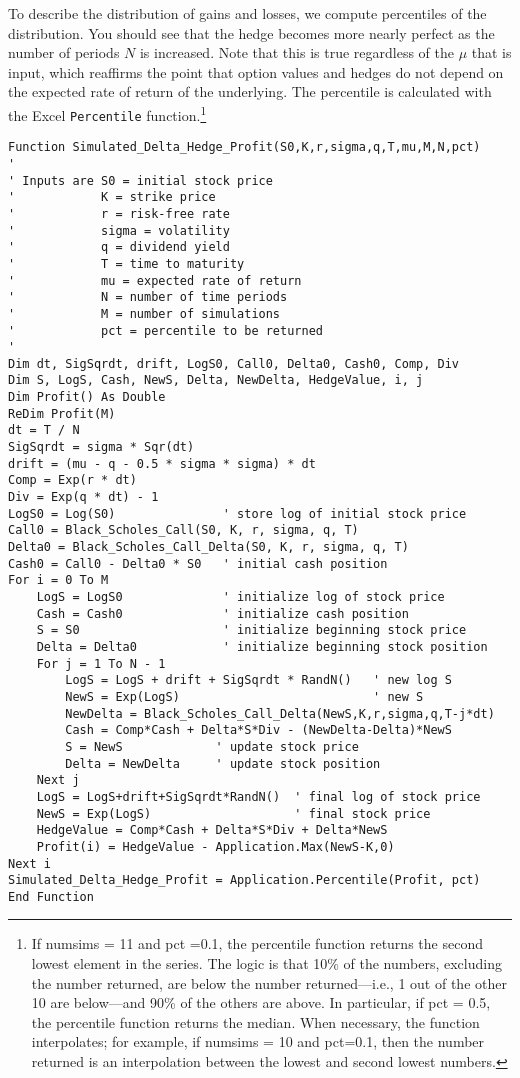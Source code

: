 To describe the distribution of gains and losses, we compute percentiles of the distribution.  You should see that the hedge becomes more nearly perfect as the number of periods $N$ is increased.  Note that this is true regardless of the $\mu$ that is input, which reaffirms the point that option values and hedges do not depend on the expected rate of return of the underlying. The percentile is calculated with the Excel \verb!Percentile! function.\footnote{If numsims = 11 and pct =0.1, the percentile function returns the second lowest element in the series.  The logic is that 10\% of the numbers, excluding the number returned, are below the number returned---i.e., 1 out of the other 10 are below---and 90\% of the others are above.  In particular, if pct = 0.5, the percentile function returns the median.  When necessary, the function interpolates; for example, if numsims = 10 and pct=0.1, then the number returned is an interpolation between the lowest and second lowest numbers.} 

\small\begin{verbatim}
Function Simulated_Delta_Hedge_Profit(S0,K,r,sigma,q,T,mu,M,N,pct)
'
' Inputs are S0 = initial stock price
'            K = strike price
'            r = risk-free rate
'            sigma = volatility
'            q = dividend yield
'            T = time to maturity
'            mu = expected rate of return
'            N = number of time periods
'            M = number of simulations
'            pct = percentile to be returned
'
Dim dt, SigSqrdt, drift, LogS0, Call0, Delta0, Cash0, Comp, Div
Dim S, LogS, Cash, NewS, Delta, NewDelta, HedgeValue, i, j
Dim Profit() As Double
ReDim Profit(M)
dt = T / N
SigSqrdt = sigma * Sqr(dt)
drift = (mu - q - 0.5 * sigma * sigma) * dt
Comp = Exp(r * dt)
Div = Exp(q * dt) - 1
LogS0 = Log(S0)               ' store log of initial stock price
Call0 = Black_Scholes_Call(S0, K, r, sigma, q, T)
Delta0 = Black_Scholes_Call_Delta(S0, K, r, sigma, q, T)
Cash0 = Call0 - Delta0 * S0   ' initial cash position
For i = 0 To M
    LogS = LogS0              ' initialize log of stock price
    Cash = Cash0              ' initialize cash position
    S = S0                    ' initialize beginning stock price
    Delta = Delta0            ' initialize beginning stock position
    For j = 1 To N - 1
        LogS = LogS + drift + SigSqrdt * RandN()   ' new log S
        NewS = Exp(LogS)                           ' new S
        NewDelta = Black_Scholes_Call_Delta(NewS,K,r,sigma,q,T-j*dt)
        Cash = Comp*Cash + Delta*S*Div - (NewDelta-Delta)*NewS
        S = NewS             ' update stock price
        Delta = NewDelta     ' update stock position
    Next j
    LogS = LogS+drift+SigSqrdt*RandN()  ' final log of stock price
    NewS = Exp(LogS)                    ' final stock price
    HedgeValue = Comp*Cash + Delta*S*Div + Delta*NewS
    Profit(i) = HedgeValue - Application.Max(NewS-K,0)
Next i
Simulated_Delta_Hedge_Profit = Application.Percentile(Profit, pct)
End Function
\end{verbatim}\normalsize

